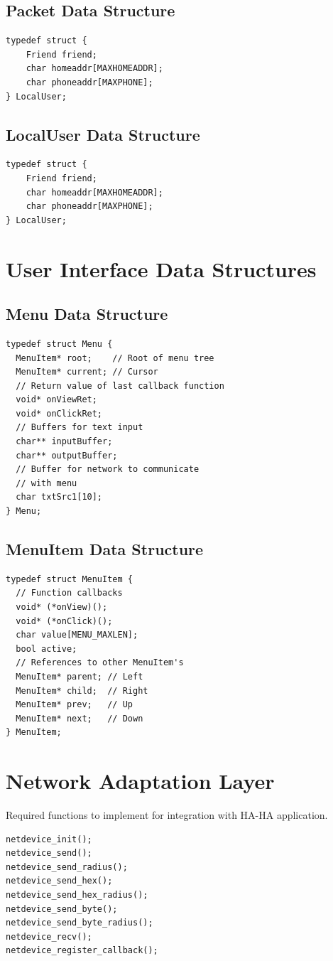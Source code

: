 \documentclass[journal,compsoc]{IEEEtran}
\begin{document}
\subsection{Packet Data Structure}
\label{Packet Data Structure}
\begin{lstlisting}
typedef struct {
	Friend friend;
	char homeaddr[MAXHOMEADDR];
	char phoneaddr[MAXPHONE];
} LocalUser;
\end{lstlisting}

\subsection{LocalUser Data Structure}
\label{LocalUser Data Structure}
\begin{lstlisting}
typedef struct {
	Friend friend;
	char homeaddr[MAXHOMEADDR];
	char phoneaddr[MAXPHONE];
} LocalUser;
\end{lstlisting}

\section{User Interface Data Structures}

\subsection{Menu Data Structure}
\begin{lstlisting}
typedef struct Menu {
  MenuItem* root;    // Root of menu tree
  MenuItem* current; // Cursor
  // Return value of last callback function
  void* onViewRet;
  void* onClickRet;
  // Buffers for text input
  char** inputBuffer;
  char** outputBuffer;
  // Buffer for network to communicate 
  // with menu
  char txtSrc1[10]; 
} Menu;
\end{lstlisting}

\subsection{MenuItem Data Structure}
\label{MenuItem Code}
\begin{lstlisting}
typedef struct MenuItem {
  // Function callbacks
  void* (*onView)();
  void* (*onClick)();
  char value[MENU_MAXLEN];
  bool active;
  // References to other MenuItem's
  MenuItem* parent; // Left
  MenuItem* child;  // Right
  MenuItem* prev;   // Up
  MenuItem* next;   // Down
} MenuItem;
\end{lstlisting}

\section{Network Adaptation Layer}
\label{appendixnetadapt}
Required functions to implement for integration with HA-HA application.
\begin{lstlisting}
netdevice_init();
netdevice_send();
netdevice_send_radius();
netdevice_send_hex();
netdevice_send_hex_radius();
netdevice_send_byte();
netdevice_send_byte_radius();
netdevice_recv();
netdevice_register_callback();
\end{lstlisting}
\end{document}
